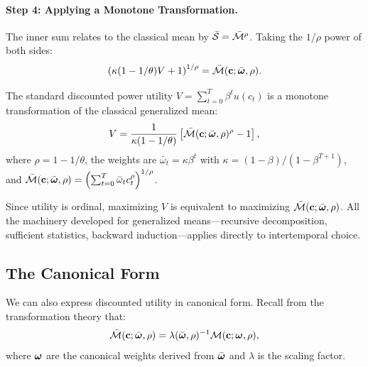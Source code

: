 \paragraph{Step 4: Applying a Monotone Transformation.}
The inner sum relates to the classical mean by $\bar{\mathcal{S}} = \bar{\mathcal{M}}^\rho$. Taking the $1/\rho$ power of both sides:
\begin{equation}
\left( \kappa (1 - 1/\theta) V + 1 \right)^{1/\rho} = \bar{\mathcal{M}}(\mathbf{c}; \bar{\boldsymbol{\omega}}, \rho).
\label{eq:monotone-transform}
\end{equation}

\begin{proposition}
\label{prop:utility-as-mean}
The standard discounted power utility $V = \sum_{t=0}^{T} \beta^t u(c_t)$ is a monotone transformation of the classical generalized mean:
\begin{equation}
V = \frac{1}{\kappa(1-1/\theta)} \left[ \bar{\mathcal{M}}(\mathbf{c}; \bar{\boldsymbol{\omega}}, \rho)^{\rho} - 1 \right],
\end{equation}
where $\rho = 1 - 1/\theta$, the weights are $\bar{\omega}_t = \kappa \beta^t$ with $\kappa = (1-\beta)/(1-\beta^{T+1})$, and $\bar{\mathcal{M}}(\mathbf{c}; \bar{\boldsymbol{\omega}}, \rho) = \left( \sum_{t=0}^{T} \bar{\omega}_t c_t^\rho \right)^{1/\rho}$.
\end{proposition}

\begin{calloutimportant}
Since utility is ordinal, maximizing $V$ is equivalent to maximizing $\bar{\mathcal{M}}(\mathbf{c}; \bar{\boldsymbol{\omega}}, \rho)$. All the machinery developed for generalized means---recursive decomposition, sufficient statistics, backward induction---applies directly to intertemporal choice.
\end{calloutimportant}

\subsection{The Canonical Form}
\label{subsec:canonical-intertemporal}

We can also express discounted utility in canonical form. Recall from the transformation theory that:
\begin{equation}
\bar{\mathcal{M}}(\mathbf{c}; \bar{\boldsymbol{\omega}}, \rho) = \lambda(\bar{\boldsymbol{\omega}}, \rho)^{-1} \mathcal{M}(\mathbf{c}; \boldsymbol{\omega}, \rho),
\label{eq:classical-canonical-relation}
\end{equation}
where $\boldsymbol{\omega}$ are the canonical weights derived from $\bar{\boldsymbol{\omega}}$ and $\lambda$ is the scaling factor.

